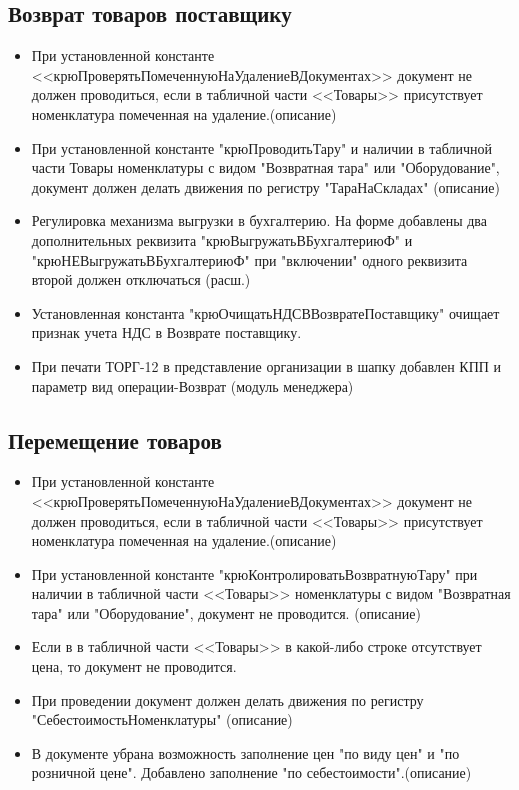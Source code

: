 \subsection{Возврат товаров поставщику}
\begin{itemize}
	\item При установленной константе <<крюПроверятьПомеченнуюНаУдалениеВДокументах>>
	документ не должен проводиться, если в табличной части <<Товары>> присутствует 
	номенклатура помеченная на удаление.(описание)
	\item При установленной константе "крюПроводитьТару" и наличии в табличной части
	 Товары номенклатуры	с видом "Возвратная тара" или "Оборудование", документ должен делать движения по регистру "ТараНаСкладах" (описание)
	\item  Регулировка механизма выгрузки в бухгалтерию. На форме добавлены два дополнительных реквизита "крюВыгружатьВБухгалтериюФ" и "крюНЕВыгружатьВБухгалтериюФ" при "включении" одного реквизита второй должен отключаться
	 (расш.)
	\item Установленная константа "крюОчищатьНДСВВозвратеПоставщику" очищает признак учета НДС в Возврате поставщику.
	\item При печати ТОРГ-12 в представление организации в шапку добавлен КПП и параметр вид операции-Возврат (модуль менеджера)

\end{itemize}


\subsection{Перемещение товаров}

\begin{itemize}
	\item При установленной константе <<крюПроверятьПомеченнуюНаУдалениеВДокументах>>
	документ не должен проводиться, если в табличной части <<Товары>> присутствует 
	номенклатура помеченная на удаление.(описание)
	\item При установленной константе "крюКонтролироватьВозвратнуюТару" при наличии в табличной части <<Товары>> номенклатуры
	с видом "Возвратная тара" или "Оборудование", документ не проводится. (описание)
	\item Если в в табличной части <<Товары>> в какой-либо строке отсутствует цена, то документ не проводится.
	\item При проведении документ должен делать движения по регистру "СебестоимостьНоменклатуры" (описание)
	\item В документе убрана возможность заполнение цен "по виду цен" и "по розничной цене". Добавлено заполнение "по себестоимости".(описание) 
\end{itemize}


